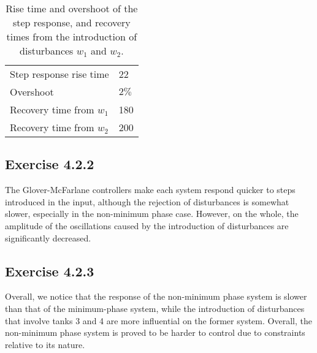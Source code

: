 \begin{table}[H]\centering
    \begin{tabular}{l|l}
    Step response rise time     & 22 \\
    Overshoot                   & $2\%$   \\
    Recovery time from $w_1$    & 180 \\
    Recovery time from $w_2$    & 200 \\
    \end{tabular}
    \caption{Rise time and overshoot of the step response, and recovery times
      from the introduction of disturbances $w_1$ and $w_2$.}
    \label{tbl:nmp_421}
\end{table}


\subsection*{Exercise 4.2.2}
The Glover-McFarlane controllers make each system respond quicker to steps
introduced in the input, although the rejection of disturbances is somewhat
slower, especially in the non-minimum phase case. However, on the whole,
the amplitude of the oscillations caused by the introduction of disturbances
are significantly decreased.


\subsection*{Exercise 4.2.3}
Overall, we notice that the response of the non-minimum phase system is slower
than that of the minimum-phase system, while the introduction of disturbances
that involve tanks 3 and 4 are more influential on the former system. Overall,
the non-minimum phase system is proved to be harder to control due to constraints
relative to its nature.
